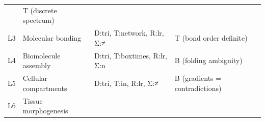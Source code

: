 \begin{longtable}[]{@{}llll@{}}
\begin{minipage}[t]{0.27\columnwidth}
\end{minipage} & \begin{minipage}[t]{0.25\columnwidth}\raggedright
T (discrete spectrum)\strut
\end{minipage}\tabularnewline
\begin{minipage}[t]{0.13\columnwidth}\raggedright
L3\strut
\end{minipage} & \begin{minipage}[t]{0.23\columnwidth}\raggedright
Molecular bonding\strut
\end{minipage} & \begin{minipage}[t]{0.27\columnwidth}\raggedright
D:tri, T:network, R:lr, Σ:≠\strut
\end{minipage} & \begin{minipage}[t]{0.25\columnwidth}\raggedright
T (bond order definite)\strut
\end{minipage}\tabularnewline
\begin{minipage}[t]{0.13\columnwidth}\raggedright
L4\strut
\end{minipage} & \begin{minipage}[t]{0.23\columnwidth}\raggedright
Biomolecule assembly\strut
\end{minipage} & \begin{minipage}[t]{0.27\columnwidth}\raggedright
D:tri, T:boxtimes, R:lr, Σ:n\strut
\end{minipage} & \begin{minipage}[t]{0.25\columnwidth}\raggedright
B (folding ambiguity)\strut
\end{minipage}\tabularnewline
\begin{minipage}[t]{0.13\columnwidth}\raggedright
L5\strut
\end{minipage} & \begin{minipage}[t]{0.23\columnwidth}\raggedright
Cellular compartments\strut
\end{minipage} & \begin{minipage}[t]{0.27\columnwidth}\raggedright
D:tri, T:in, R:lr, Σ:≠\strut
\end{minipage} & \begin{minipage}[t]{0.25\columnwidth}\raggedright
B (gradients = contradictions)\strut
\end{minipage}\tabularnewline
\begin{minipage}[t]{0.13\columnwidth}\raggedright
L6\strut
\end{minipage} & \begin{minipage}[t]{0.23\columnwidth}\raggedright
Tissue morphogenesis\strut

\end{minipage}
\end{longtable}
